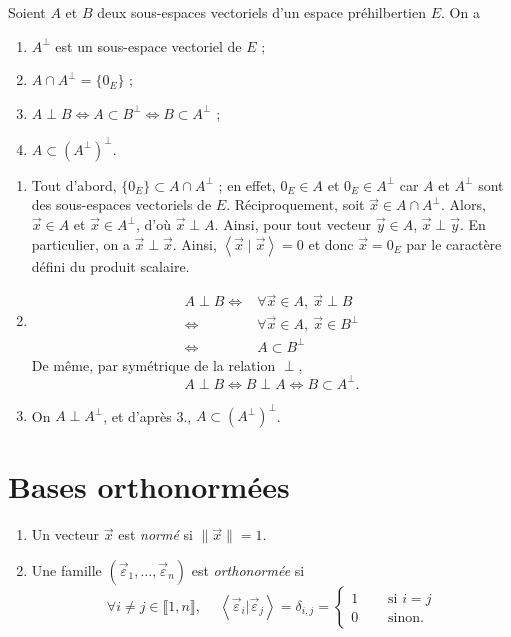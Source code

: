 
\begin{prop}
	Soient $A$\/ et $B$\/ deux sous-espaces vectoriels d'un espace préhilbertien $E$. On a
	\begin{enumerate}
		\item $A^\perp$\/ est un sous-espace vectoriel de $E$\/ ;
		\item $A \cap  A^\perp = \{0_E\}$\/ ;
		\item $A \perp B \iff A \subset B^\perp \iff B \subset A^\perp$\/ ;
		\item $A \subset (A^\perp)^\perp$.
	\end{enumerate}
\end{prop}

\begin{prv}
	\begin{enumerate}[start=2]
		\item Tout d'abord, $\{0_E\} \subset A \cap A^\perp$\/ ; en effet, $0_E \in A$\/ et $0_E \in A^\perp$\/ car $A$\/ et $A^\perp$ sont des sous-espaces vectoriels de $E$.
			Réciproquement, soit $\vec{x} \in A \cap A^\perp$. Alors, $\vec{x} \in A$\/ et $\vec{x} \in A^\perp$, d'où $\vec{x} \perp A$. Ainsi, pour tout vecteur $\vec{y} \in A$, $\vec{x} \perp \vec{y}$. En particulier, on a $\vec{x} \perp \vec{x}$. Ainsi, $\left<\vec{x}  \mid \vec{x} \right> = 0$\/ et donc $\vec{x} = 0_E$\/ par le caractère défini du produit scalaire.
		\item
			\begin{align*}
				A \perp B \iff& \forall \vec{x} \in A,\:\vec{x} \perp B\\
				\iff& \forall \vec{x} \in A,\: \vec{x} \in B^\perp\\
				\iff& A \subset B^\perp
			\end{align*}
			De même, par symétrique de la relation $\perp$, \[
				A \perp B \iff B \perp A \iff B \subset A^\perp
			.\]
		\item On $A \perp A^\perp$, et d'après 3., $A \subset (A^\perp)^\perp$.
	\end{enumerate}
\end{prv}

\section{Bases orthonormées}

\begin{defn}
	\begin{enumerate}
		\item Un vecteur $\vec{x}$\/ est \textit{normé} si $\|\vec{x}\| = 1$.
		\item Une famille $(\vec{\varepsilon}_1, \ldots, \vec{\varepsilon}_n)$\/ est \textit{orthonormée} si \[
			\forall i \neq j \in \llbracket 1,n \rrbracket,\:\quad \left<\vec{\varepsilon}_i | \vec{\varepsilon}_j \right> = \delta_{i,j} = \begin{cases}
				1 &\quad\text{ si } i = j\\
				0 &\quad \text{ sinon}.
			\end{cases}
		\]
	\end{enumerate}
\end{defn}

